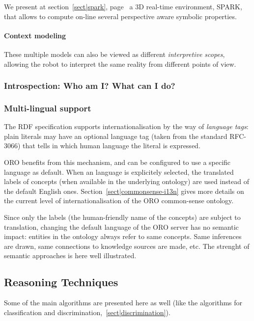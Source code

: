 We present at section~\ref{sect|spark}, page~\pageref{sect|spark} a 3D
real-time environment, SPARK, that allows to compute on-line several
perspective aware symbolic properties.

\paragraph{Context modeling}

These multiple models can also be viewed as different \emph{interpretive
scopes}, allowing the robot to interpret the same reality from different points
of view.



\subsubsection{Introspection: Who am I? What can I do?}

\subsubsection{Multi-lingual support}
\label{sect|multilingual}

The RDF specification supports internationalisation by the way of
\emph{language tags}: plain literals may have an optional language tag (taken
from the standard RFC-3066) that tells in which human language the literal is
expressed.

ORO benefits from this mechanism, and can be configured to use a specific
language as default. When an language is explicitely selected, the translated
labels of concepts (when available in the underlying ontology) are used instead
of the default English ones. Section~\ref{sect|commonsense-i13n} gives more
details on the current level of internationalisation of the ORO common-sense
ontology.

Since only the labels (\ie the human-friendly name of the concepts) are subject
to translation, changing the default language of the ORO server has no semantic
impact: entities in the ontology always refer to same concepts. Same inferences
are drawn, same connections to knowledge sources are made, etc. The strenght of
semantic approaches is here well illustrated.

\subsection{Reasoning Techniques}

Some of the main algorithms are presented here as well (like the algorithms for
classification and discrimination,~\ref{sect|discrimination}).


